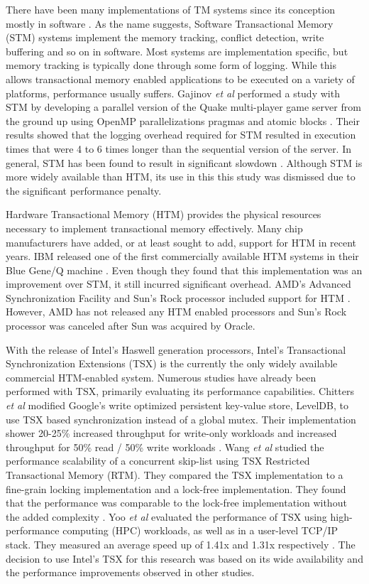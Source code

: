 \documentclass[11pt]{book}
\begin{document}
There have been many implementations of TM systems since its conception mostly in software
\cite{yoo_tsx,chitters_tsx,rock_dice,chung_amd,blue_wang,quake_stm,stm_cascaval}.  As the
name suggests, Software Transactional Memory (STM) systems implement the memory tracking,
conflict detection, write buffering and so on in software.  Most systems are
implementation specific, but memory tracking is typically done through some form of
logging.  While this allows transactional memory enabled applications to be executed on a
variety of platforms, performance usually suffers.  Gajinov \emph{et al} performed a study
with STM by developing a parallel version of the Quake multi-player game server from the
ground up using OpenMP parallelizations pragmas and atomic blocks \cite{quake_stm}.  Their
results showed that the logging overhead required for STM resulted in execution times that
were 4 to 6 times longer than the sequential version of the server.  In general, STM has
been found to result in significant slowdown \cite{stm_cascaval}.  Although STM is more
widely available than HTM, its use in this this study was dismissed due to the significant
performance penalty.

Hardware Transactional Memory (HTM) provides the physical resources necessary to implement
transactional memory effectively.  Many chip manufacturers have added, or at least sought
to add, support for HTM in recent years.  IBM released one of the first commercially
available HTM systems in their Blue Gene/Q machine \cite{blue_wang}.  Even though they
found that this implementation was an improvement over STM, it still incurred significant
overhead.  AMD's Advanced Synchronization Facility and Sun's Rock processor included
support for HTM \cite{chung_amd,rock_dice}.  However, AMD has not released any HTM enabled
processors and Sun's Rock processor was canceled after Sun was acquired by Oracle.

With the release of Intel's Haswell generation processors, Intel's Transactional
Synchronization Extensions (TSX) is the currently the only widely available commercial
HTM-enabled system.  Numerous studies have already been performed with TSX, primarily
evaluating its performance capabilities.  Chitters \emph{et al} modified Google's write
optimized persistent key-value store, LevelDB, to use TSX based synchronization instead of
a global mutex.  Their implementation shower 20-25\% increased throughput for write-only
workloads and increased throughput for 50\% read / 50\% write workloads
\cite{chitters_tsx}.  Wang \emph{et al} studied the performance scalability of a
concurrent skip-list using TSX Restricted Transactional Memory (RTM).  They compared the
TSX implementation to a fine-grain locking implementation and a lock-free implementation.
They found that the performance was comparable to the lock-free implementation without the
added complexity \cite{wang_tsx}.  Yoo \emph{et al} evaluated the performance of TSX using
high-performance computing (HPC) workloads, as well as in a user-level TCP/IP stack.  They
measured an average speed up of 1.41x and 1.31x respectively \cite{yoo_tsx}.  The decision
to use Intel's TSX for this research was based on its wide availability and the
performance improvements observed in other studies.
\end{document}
